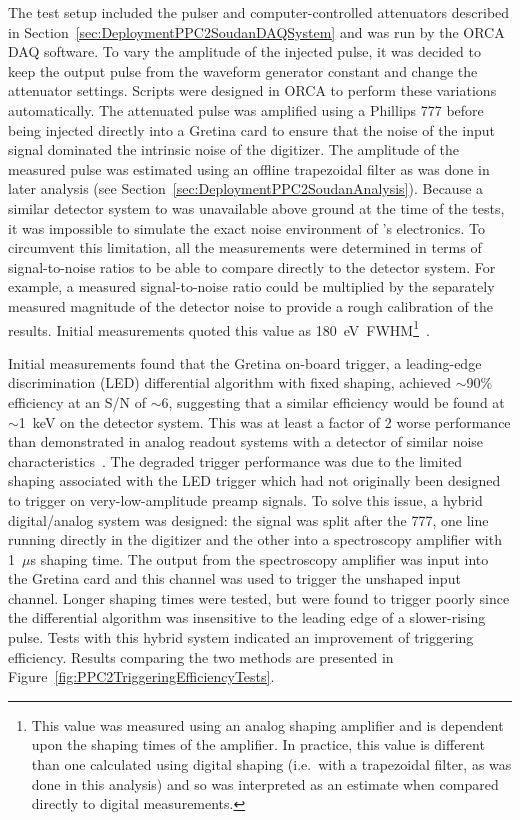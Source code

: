 	The test setup included the pulser and computer-controlled attenuators described in Section~\ref{sec:DeploymentPPC2SoudanDAQSystem} and was run by the ORCA DAQ software.  To vary the amplitude of the injected pulse, it was decided to keep the output pulse from the waveform generator constant and change the attenuator settings.  Scripts were designed in ORCA to perform these variations automatically.  The attenuated pulse was amplified using a Phillips 777 before being injected directly into a Gretina card to ensure that the noise of the input signal dominated the intrinsic noise of the digitizer.  The amplitude of the measured pulse was estimated using an offline trapezoidal filter as was done in later analysis (see Section~\ref{sec:DeploymentPPC2SoudanAnalysis}).  Because a similar detector system to  was unavailable above ground at the time of the tests, it was impossible to simulate the exact noise environment of 's electronics.  To circumvent this limitation, all the measurements were determined in terms of signal-to-noise ratios to be able to compare directly to the detector system.  For example, a measured signal-to-noise ratio could be multiplied by the separately measured magnitude of the detector noise to provide a rough calibration of the results.  Initial measurements quoted this value as 180~eV~FWHM\footnote{This value was measured using an analog shaping amplifier and is dependent upon the shaping times of the amplifier.  In practice, this value is different than one calculated using digital shaping (i.e.~with a trapezoidal filter, as was done in this analysis) and so was interpreted as an estimate when compared directly to digital measurements.}~\cite{Orr2007}.  
	
		Initial measurements found that the Gretina on-board trigger, a leading-edge discrimination (LED) differential algorithm with fixed shaping, achieved $\sim$90\% efficiency at an S/N of $\sim$6, suggesting that a similar efficiency would be found at $\sim$1~keV on the detector system.  This was at least a factor of 2 worse performance than demonstrated in analog readout systems with a detector of similar noise characteristics~\cite{Barb07}.  The degraded trigger performance was due to the limited shaping associated with the LED trigger which had not originally been designed to trigger on very-low-amplitude preamp signals.  To solve this issue, a hybrid digital/analog system was designed: the signal was split after the 777, one line running directly in the digitizer and the other into a spectroscopy amplifier with 1~$\mu$s shaping time.  The output from the spectroscopy amplifier was input into the Gretina card and this channel was used to trigger the unshaped input channel.  Longer shaping times were tested, but were found to trigger poorly since the differential algorithm was insensitive to the leading edge of a slower-rising pulse.  Tests with this hybrid system indicated an improvement of triggering efficiency.  Results comparing the two methods are presented in Figure~\ref{fig:PPC2TriggeringEfficiencyTests}.  
	
